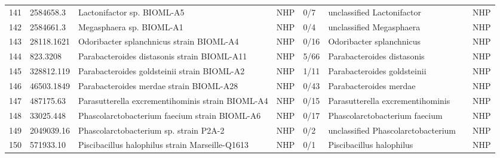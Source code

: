 \begin{longtable}{llllllll}
141 &     2584658.3 &                                               Lactonifactor sp. BIOML-A5 &   NHP &       0/7 &                     unclassified Lactonifactor &                 \cite{poyet2019library,clavel2007clostridium} &   NHP \\
142 &     2584661.3 &                                                 Megasphaera sp. BIOML-A1 &   NHP &       0/4 &                       unclassified Megasphaera &                 \cite{poyet2019library,shetty2013comparative} &   NHP \\
143 &    28118.1621 &                                 Odoribacter splanchnicus strain BIOML-A4 &   NHP &      0/16 &                       Odoribacter splanchnicus &                     \cite{poyet2019library,hiippala2020novel} &   NHP \\
144 &      823.3208 &                              Parabacteroides distasonis strain BIOML-A11 &   NHP &      5/66 &                     Parabacteroides distasonis &               \cite{poyet2019library,wang2019parabacteroides} &   NHP \\
145 &    328812.119 &                              Parabacteroides goldsteinii strain BIOML-A2 &   NHP &      1/11 &                    Parabacteroides goldsteinii &                             \cite{poyet2019library,wu2019gut} &   NHP \\
146 &    46503.1849 &                                  Parabacteroides merdae strain BIOML-A28 &   NHP &      0/43 &                         Parabacteroides merdae &          \cite{poyet2019library,sakamoto2006reclassification} &   NHP \\
147 &     487175.63 &                         Parasutterella excrementihominis strain BIOML-A4 &   NHP &      0/15 &               Parasutterella excrementihominis &                        \cite{poyet2019library,ju2019defining} &   NHP \\
148 &     33025.448 &                            Phascolarctobacterium faecium strain BIOML-A6 &   NHP &      0/17 &                  Phascolarctobacterium faecium &   \cite{poyet2019library,wu2017phascolarctobacteriumafaecium} &   NHP \\
149 &    2049039.16 &                                   Phascolarctobacterium sp. strain P2A-2 &   NHP &       0/2 &             unclassified Phascolarctobacterium &                    \cite{wu2017phascolarctobacteriumafaecium} &   NHP \\
150 &     571933.10 &                          Piscibacillus halophilus strain Marseille-Q1613 &   NHP &       0/1 &                       Piscibacillus halophilus &                                              \cite{571933.10} &   NHP \\

\end{longtable}
